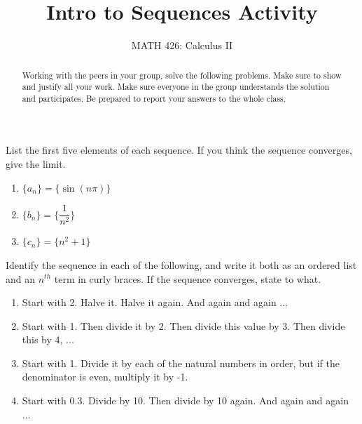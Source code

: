 \documentclass{ximera}
\title{Intro to Sequences Activity}
\author{MATH 426: Calculus II}
\begin{document}
\begin{abstract}
   Working with the peers in your group, solve the following problems. Make sure to show and justify all your work. Make sure everyone in the group understands the solution and participates. Be prepared to report your answers to the whole class. 
\end{abstract}
\maketitle

\begin{exercise}
 List the first five elements of each sequence.  If you think the sequence converges, give the limit.
\begin{enumerate}
    \item $\{a_n\}=\{\sin(n\pi)\}$
    \item $\{b_n\}=\bigg\{\dfrac{1}{n^2}\bigg\}$
    \item $\{c_n\}=\{n^2+1\}$
\end{enumerate}

\end{exercise}

\begin{exercise}
    Identify the sequence in each of the following, and write it both as an ordered list and an $n^{th}$ term in curly braces. If the sequence converges, state to what.
\begin{enumerate}
    \item Start with 2.  Halve it.  Halve it again. And again and again ... 
    \item Start with 1.  Then divide it by 2.  Then divide this value by 3.  Then divide this by 4, ... 
    \item Start with 1.  Divide it by each of the natural numbers in order, but if the denominator is even, multiply it by -1.
    \item Start with 0.3.  Divide by 10.  Then divide by 10 again.  And again and again ...
\end{enumerate}
\end{exercise}
\end{document}
